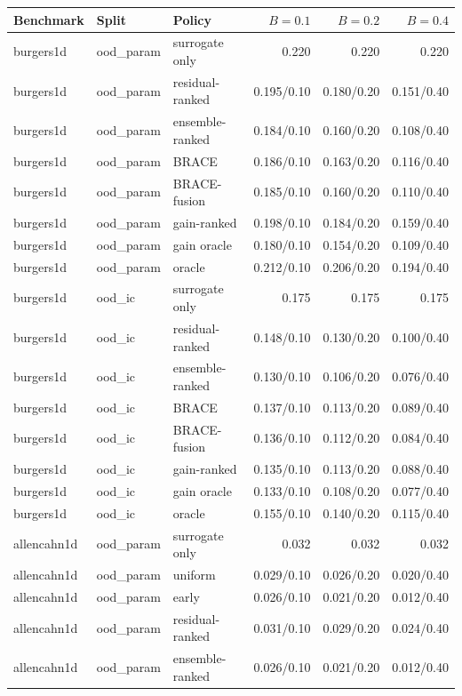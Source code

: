 \begin{tabular}{lllrrr}
\toprule
Benchmark & Split & Policy & $B=0.1$ & $B=0.2$ & $B=0.4$ \\
\midrule
burgers1d & ood\_param & surrogate only & 0.220 & 0.220 & 0.220 \\
burgers1d & ood\_param & residual-ranked & 0.195/0.10 & 0.180/0.20 & 0.151/0.40 \\
burgers1d & ood\_param & ensemble-ranked & 0.184/0.10 & 0.160/0.20 & 0.108/0.40 \\
burgers1d & ood\_param & BRACE & 0.186/0.10 & 0.163/0.20 & 0.116/0.40 \\
burgers1d & ood\_param & BRACE-fusion & 0.185/0.10 & 0.160/0.20 & 0.110/0.40 \\
burgers1d & ood\_param & gain-ranked & 0.198/0.10 & 0.184/0.20 & 0.159/0.40 \\
burgers1d & ood\_param & gain oracle & 0.180/0.10 & 0.154/0.20 & 0.109/0.40 \\
burgers1d & ood\_param & oracle & 0.212/0.10 & 0.206/0.20 & 0.194/0.40 \\
\midrule
burgers1d & ood\_ic & surrogate only & 0.175 & 0.175 & 0.175 \\
burgers1d & ood\_ic & residual-ranked & 0.148/0.10 & 0.130/0.20 & 0.100/0.40 \\
burgers1d & ood\_ic & ensemble-ranked & 0.130/0.10 & 0.106/0.20 & 0.076/0.40 \\
burgers1d & ood\_ic & BRACE & 0.137/0.10 & 0.113/0.20 & 0.089/0.40 \\
burgers1d & ood\_ic & BRACE-fusion & 0.136/0.10 & 0.112/0.20 & 0.084/0.40 \\
burgers1d & ood\_ic & gain-ranked & 0.135/0.10 & 0.113/0.20 & 0.088/0.40 \\
burgers1d & ood\_ic & gain oracle & 0.133/0.10 & 0.108/0.20 & 0.077/0.40 \\
burgers1d & ood\_ic & oracle & 0.155/0.10 & 0.140/0.20 & 0.115/0.40 \\
\midrule
allencahn1d & ood\_param & surrogate only & 0.032 & 0.032 & 0.032 \\
allencahn1d & ood\_param & uniform & 0.029/0.10 & 0.026/0.20 & 0.020/0.40 \\
allencahn1d & ood\_param & early & 0.026/0.10 & 0.021/0.20 & 0.012/0.40 \\
allencahn1d & ood\_param & residual-ranked & 0.031/0.10 & 0.029/0.20 & 0.024/0.40 \\
allencahn1d & ood\_param & ensemble-ranked & 0.026/0.10 & 0.021/0.20 & 0.012/0.40 \\

\end{tabular}
